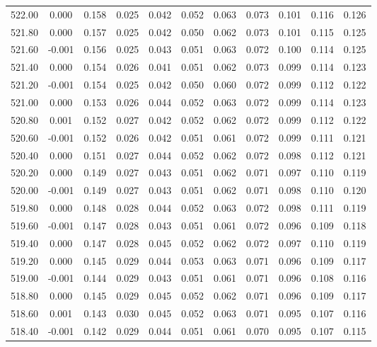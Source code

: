 \begin{longtable}{cccccccccc}
    522.00 &  0.000 &  0.158 &  0.025 &  0.042 &  0.052 &  0.063 &  0.073 &  0.101 &  0.116 &  0.126 \\
    521.80 &  0.000 &  0.157 &  0.025 &  0.042 &  0.050 &  0.062 &  0.073 &  0.101 &  0.115 &  0.125 \\
    521.60 & -0.001 &  0.156 &  0.025 &  0.043 &  0.051 &  0.063 &  0.072 &  0.100 &  0.114 &  0.125 \\
    521.40 &  0.000 &  0.154 &  0.026 &  0.041 &  0.051 &  0.062 &  0.073 &  0.099 &  0.114 &  0.123 \\
    521.20 & -0.001 &  0.154 &  0.025 &  0.042 &  0.050 &  0.060 &  0.072 &  0.099 &  0.112 &  0.122 \\
    521.00 &  0.000 &  0.153 &  0.026 &  0.044 &  0.052 &  0.063 &  0.072 &  0.099 &  0.114 &  0.123 \\
    520.80 &  0.001 &  0.152 &  0.027 &  0.042 &  0.052 &  0.062 &  0.072 &  0.099 &  0.112 &  0.122 \\
    520.60 & -0.001 &  0.152 &  0.026 &  0.042 &  0.051 &  0.061 &  0.072 &  0.099 &  0.111 &  0.121 \\
    520.40 &  0.000 &  0.151 &  0.027 &  0.044 &  0.052 &  0.062 &  0.072 &  0.098 &  0.112 &  0.121 \\
    520.20 &  0.000 &  0.149 &  0.027 &  0.043 &  0.051 &  0.062 &  0.071 &  0.097 &  0.110 &  0.119 \\
    520.00 & -0.001 &  0.149 &  0.027 &  0.043 &  0.051 &  0.062 &  0.071 &  0.098 &  0.110 &  0.120 \\
    519.80 &  0.000 &  0.148 &  0.028 &  0.044 &  0.052 &  0.063 &  0.072 &  0.098 &  0.111 &  0.119 \\
    519.60 & -0.001 &  0.147 &  0.028 &  0.043 &  0.051 &  0.061 &  0.072 &  0.096 &  0.109 &  0.118 \\
    519.40 &  0.000 &  0.147 &  0.028 &  0.045 &  0.052 &  0.062 &  0.072 &  0.097 &  0.110 &  0.119 \\
    519.20 &  0.000 &  0.145 &  0.029 &  0.044 &  0.053 &  0.063 &  0.071 &  0.096 &  0.109 &  0.117 \\
    519.00 & -0.001 &  0.144 &  0.029 &  0.043 &  0.051 &  0.061 &  0.071 &  0.096 &  0.108 &  0.116 \\
    518.80 &  0.000 &  0.145 &  0.029 &  0.045 &  0.052 &  0.062 &  0.071 &  0.096 &  0.109 &  0.117 \\
    518.60 &  0.001 &  0.143 &  0.030 &  0.045 &  0.052 &  0.063 &  0.071 &  0.095 &  0.107 &  0.116 \\
    518.40 & -0.001 &  0.142 &  0.029 &  0.044 &  0.051 &  0.061 &  0.070 &  0.095 &  0.107 &  0.115 \\

\end{longtable}
